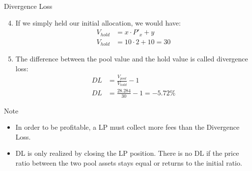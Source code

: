 \documentclass[]{beamer}
\begin{document}
\begin{frame}{Divergence Loss}

	\begin{enumerate}
	\setcounter{enumi}{3}
		\item If we simply held our initial allocation, we would have:
			\begin{align*}
				V_{hold} &= x \cdot P'_x + y\\
				V_{hold} &= 10 \cdot 2 + 10 = 30
			\end{align*}
		\item The difference between the pool value and the hold value is called divergence loss:
			\begin{align*}
				DL &= \tfrac{V_{pool}}{V_{hold}} - 1\\
				DL &= \tfrac{28.284}{30} - 1 = -5.72 \%
			\end{align*}
	\end{enumerate}	
	
	\begin{keytakeaway}{Note}
		\begin{itemize}
			\item In order to be profitable, a LP must collect more fees than the Divergence Loss.
			\item DL is only realized by closing the LP position. There is no DL if the price ratio between the two pool assets stays equal or returns to the initial ratio.
		\end{itemize}
	\end{keytakeaway}
	
\end{frame}
\end{document}
